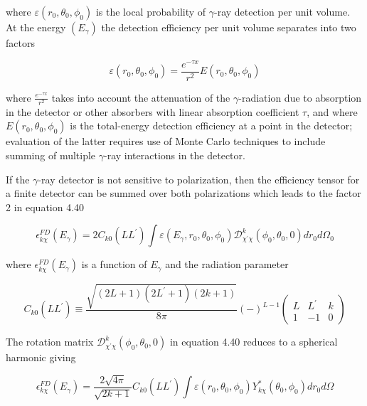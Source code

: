\documentclass[10pt]{article}
\begin{document}
where $\varepsilon\left(r_{0}, \theta_{0}, \phi_{0}\right)$ is the local probability of $\gamma$-ray detection per unit volume. At the energy $\left(E_{\gamma}\right)$ the detection efficiency per unit volume separates into two factors


\begin{equation*}
\varepsilon\left(r_{0}, \theta_{0}, \phi_{0}\right)=\frac{e^{-\tau x}}{r^{2}} E\left(r_{0}, \theta_{0}, \phi_{0}\right) \tag{4.39}
\end{equation*}


where $\frac{e^{-\tau x}}{r^{2}}$ takes into account the attenuation of the $\gamma$-radiation due to absorption in the detector or other absorbers with linear absorption coefficient $\tau$, and where $E\left(r_{0}, \theta_{0}, \phi_{0}\right)$ is the total-energy detection efficiency at a point in the detector; evaluation of the latter requires use of Monte Carlo techniques to include summing of multiple $\gamma$-ray interactions in the detector.

If the $\gamma$-ray detector is not sensitive to polarization, then the efficiency tensor for a finite detector can be summed over both polarizations which leads to the factor 2 in equation 4.40


\begin{equation*}
\epsilon_{k \chi}^{F D}\left(E_{\gamma}\right)=2 C_{k 0}\left(L L^{\prime}\right) \int \varepsilon\left(E_{\gamma}, r_{0}, \theta_{0}, \phi_{0}\right) \mathcal{D}_{\chi^{\prime} \chi}^{k}\left(\phi_{0}, \theta_{0}, 0\right) d r_{0} d \Omega_{0} \tag{4.40}
\end{equation*}


where $\epsilon_{k \chi}^{F D}\left(E_{\gamma}\right)$ is a function of $E_{\gamma}$ and the radiation parameter

\[
C_{k 0}\left(L L^{\prime}\right) \equiv \frac{\sqrt{(2 L+1)\left(2 L^{\prime}+1\right)(2 k+1)}}{8 \pi}(-)^{L-1}\left(\begin{array}{ccc}
L & L^{\prime} & k  \tag{4.41}\\
1 & -1 & 0
\end{array}\right)
\]

The rotation matrix $\mathcal{D}_{\chi^{\prime} \chi}^{k}\left(\phi_{0}, \theta_{0}, 0\right)$ in equation 4.40 reduces to a spherical harmonic giving


\begin{equation*}
\epsilon_{k \chi}^{F D}\left(E_{\gamma}\right)=\frac{2 \sqrt{4 \pi}}{\sqrt{2 k+1}} C_{k 0}\left(L L^{\prime}\right) \int \varepsilon\left(r_{0}, \theta_{0}, \phi_{0}\right) Y_{k \chi}^{*}\left(\theta_{0}, \phi_{0}\right) d r_{0} d \Omega \tag{4.42}
\end{equation*}
\end{document}
